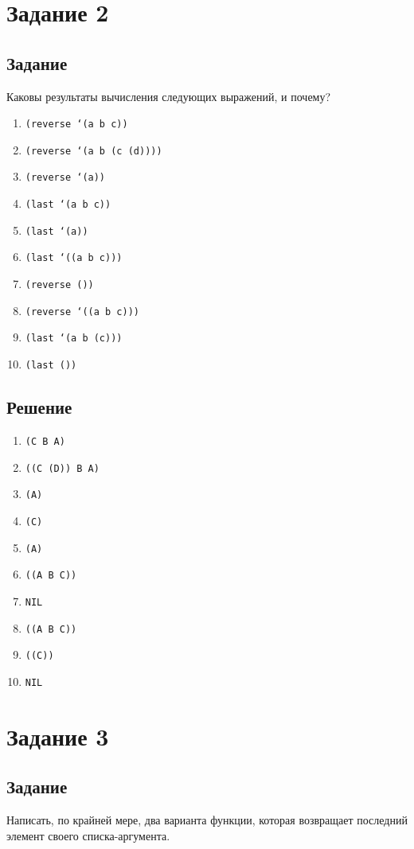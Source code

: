 \section{Задание 2}
\subsection*{Задание}
Каковы результаты вычисления следующих выражений, и почему?

\begin{enumerate}
	\item \texttt{(reverse `(a b c))}
	\item \texttt{(reverse `(a b (c (d))))}
	\item \texttt{(reverse `(a))}
	\item \texttt{(last `(a b c))}
	\item \texttt{(last `(a))}
	\item \texttt{(last `((a b c)))}
	\item \texttt{(reverse ())}
	\item \texttt{(reverse `((a b c)))}
	\item \texttt{(last `(a b (c)))}
	\item \texttt{(last ())}
\end{enumerate}

\subsection*{Решение}
\begin{enumerate}
	\item \texttt{(C B A)}
	\item \texttt{((C (D)) B A)}
	\item \texttt{(A)}
	\item \texttt{(C)}
	\item \texttt{(A)}
	\item \texttt{((A B C))}
	\item \texttt{NIL}
	\item \texttt{((A B C))}
	\item \texttt{((C))}
	\item \texttt{NIL}
\end{enumerate}


\section{Задание 3}
\subsection*{Задание}
Написать, по крайней мере, два варианта функции, которая возвращает последний элемент своего списка-аргумента.

